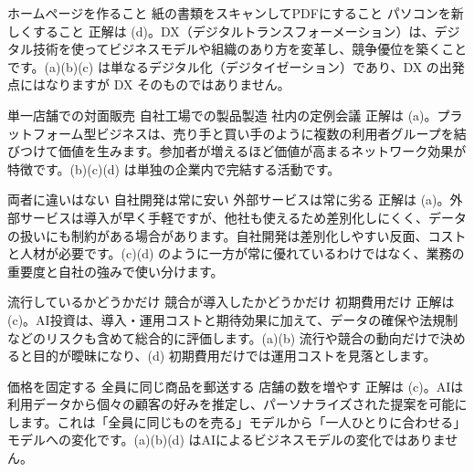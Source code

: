 
%
  {ホームページを作ること}%
  {紙の書類をスキャンしてPDFにすること}%
  {パソコンを新しくすること}%
  {}%
  {正解は (d)。DX（デジタルトランスフォーメーション）は、デジタル技術を使ってビジネスモデルや組織のあり方を変革し、競争優位を築くことです。(a)(b)(c) は単なるデジタル化（デジタイゼーション）であり、DX の出発点にはなりますが DX そのものではありません。}

%
  {}%
  {単一店舗での対面販売}%
  {自社工場での製品製造}%
  {社内の定例会議}%
  {正解は (a)。プラットフォーム型ビジネスは、売り手と買い手のように複数の利用者グループを結びつけて価値を生みます。参加者が増えるほど価値が高まるネットワーク効果が特徴です。(b)(c)(d) は単独の企業内で完結する活動です。}

%
  {}%
  {両者に違いはない}%
  {自社開発は常に安い}%
  {外部サービスは常に劣る}%
  {正解は (a)。外部サービスは導入が早く手軽ですが、他社も使えるため差別化しにくく、データの扱いにも制約がある場合があります。自社開発は差別化しやすい反面、コストと人材が必要です。(c)(d) のように一方が常に優れているわけではなく、業務の重要度と自社の強みで使い分けます。}

%
  {流行しているかどうかだけ}%
  {競合が導入したかどうかだけ}%
  {}%
  {初期費用だけ}%
  {正解は (c)。AI投資は、導入・運用コストと期待効果に加えて、データの確保や法規制などのリスクも含めて総合的に評価します。(a)(b) 流行や競合の動向だけで決めると目的が曖昧になり、(d) 初期費用だけでは運用コストを見落とします。}

%
  {価格を固定する}%
  {全員に同じ商品を郵送する}%
  {}%
  {店舗の数を増やす}%
  {正解は (c)。AIは利用データから個々の顧客の好みを推定し、パーソナライズされた提案を可能にします。これは「全員に同じものを売る」モデルから「一人ひとりに合わせる」モデルへの変化です。(a)(b)(d) はAIによるビジネスモデルの変化ではありません。}
